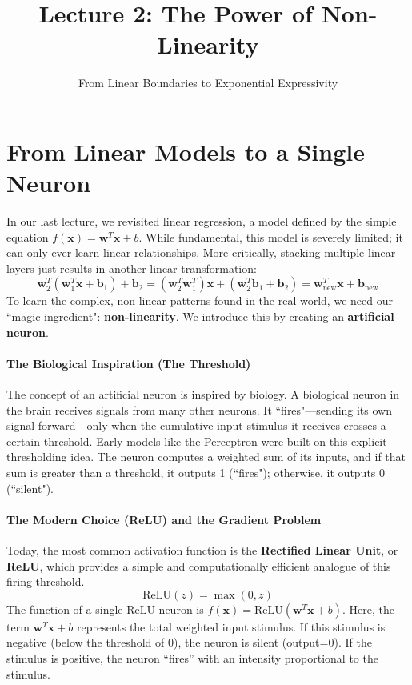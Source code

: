 \documentclass[11pt]{article}
\title{Lecture 2: The Power of Non-Linearity}
\author{From Linear Boundaries to Exponential Expressivity}
\date{}
\newcommand{\w}{\mathbf{w}}
\newcommand{\x}{\mathbf{x}}
\newcommand{\T}{^T}
\newcommand{\relu}{\text{ReLU}}
\begin{document}
\maketitle

\section{From Linear Models to a Single Neuron}

In our last lecture, we revisited linear regression, a model defined by the simple equation $f(\x) = \w\T\x + b$. While fundamental, this model is severely limited; it can only ever learn linear relationships. More critically, stacking multiple linear layers just results in another linear transformation:
\[ \w_2\T(\w_1\T\x + \mathbf{b}_1) + \mathbf{b}_2 = (\w_2\T\w_1\T)\x + (\w_2\T\mathbf{b}_1 + \mathbf{b}_2) = \w_{\text{new}}\T\x + \mathbf{b}_{\text{new}} \]
To learn the complex, non-linear patterns found in the real world, we need our ``magic ingredient": \textbf{non-linearity}. We introduce this by creating an \textbf{artificial neuron}.

\paragraph{The Biological Inspiration (The Threshold)}
The concept of an artificial neuron is inspired by biology. A biological neuron in the brain receives signals from many other neurons. It ``fires"—sending its own signal forward—only when the cumulative input stimulus it receives crosses a certain threshold. Early models like the Perceptron were built on this explicit thresholding idea. The neuron computes a weighted sum of its inputs, and if that sum is greater than a threshold, it outputs 1 (``fires"); otherwise, it outputs 0 (``silent").

\paragraph{The Modern Choice (ReLU) and the Gradient Problem}
Today, the most common activation function is the \textbf{Rectified Linear Unit}, or \textbf{ReLU}, which provides a simple and computationally efficient analogue of this firing threshold.
\begin{equation}
    \relu(z) = \max(0, z) \label{eq:relu}
\end{equation}
The function of a single ReLU neuron is $f(\x) = \relu(\w\T\x + b)$. Here, the term $\w\T\x+b$ represents the total weighted input stimulus. If this stimulus is negative (below the threshold of 0), the neuron is silent (output=0). If the stimulus is positive, the neuron ``fires'' with an intensity proportional to the stimulus.
\end{document}
